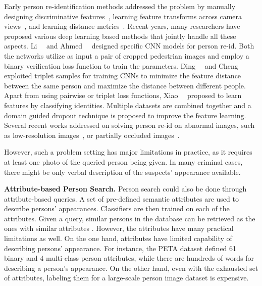 Early person re-identification methods addressed the problem by manually designing discriminative features~\cite{wang2007shape,hamdoun2008person,zhao2013unsupervised}, learning feature transforms across camera views~\cite{prosser2010person,porikli2003inter,shen2015person}, and learning distance metrics~\cite{zheng2011person,gray2008viewpoint,prosser2010person,paisitkriangkrai2015learning,liao2015efficient}. Recent years, many researchers have proposed various deep learning based methods that jointly handle all these aspects. Li~\etal~\cite{li2014deepreid} and Ahmed~\etal~\cite{ahmed2015improved} designed specific CNN models for person re-id. Both the networks utilize as input a pair of cropped pedestrian images and employ a binary verification loss function to train the parameters. Ding~\etal~\cite{ding2015deep} and Cheng~\etal~\cite{cheng2016person} exploited triplet samples for training CNNs to minimize the feature distance between the same person and maximize the distance between different people. Apart from using pairwise or triplet loss functions, Xiao~\etal~\cite{xiao2016learning} proposed to learn features by classifying identities. Multiple datasets are combined together and a domain guided dropout technique is proposed to improve the feature learning. Several recent works addressed on solving person re-id on abnormal images, such as low-resolution images~\cite{li2015multi}, or partially occluded images~\cite{zheng2015partial}.

However, such a problem setting has major limitations in practice, as it requires at least one photo of the queried person being given. In many criminal cases, there might be only verbal description of the suspects' appearance available.

\textbf{Attribute-based Person Search.} Person search could also be done through attribute-based queries. A set of pre-defined semantic attributes are used to describe persons' appearances. Classifiers are then trained on each of the attributes. Given a query, similar persons in the database can be retrieved as the ones with similar attributes \cite{vaquero2009attribute,su2016deep}. However, the attributes have many practical limitations as well. On the one hand, attributes have limited capability of describing persons' appearance. For instance, the PETA dataset \cite{deng2014pedestrian} defined 61 binary and 4 multi-class person attributes, while there are hundreds of words for describing a person's appearance. On the other hand, even with the exhausted set of attributes, labeling them for a large-scale person image dataset is expensive. 


